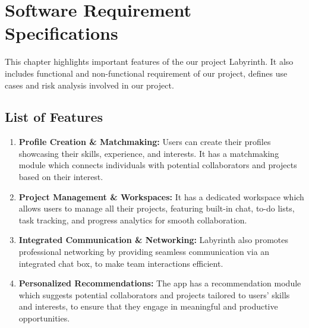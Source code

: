 \documentclass{FastFyp}
\begin{document}
\chapter{Software Requirement Specifications}
This chapter highlights important features of the our project Labyrinth. It also includes functional and non-functional requirement of our project, defines use cases and risk analysis involved in our project.
\section{List of Features}
\begin{enumerate}
    \item \textbf{Profile Creation \& Matchmaking:}  Users can create their profiles showcasing their skills, experience, and interests. It has a matchmaking module which connects individuals with potential collaborators and projects based on their interest.
    \item \textbf{Project Management \& Workspaces:} It has a dedicated workspace which allows users to manage all their projects, featuring built-in chat, to-do lists, task tracking, and progress analytics for smooth collaboration.
    \item \textbf{Integrated Communication \& Networking: } Labyrinth also promotes professional networking by providing seamless communication via an integrated chat box, to make team interactions efficient.
    \item \textbf{Personalized Recommendations: } The app has a recommendation module which suggests potential collaborators and projects tailored to users' skills and interests, to ensure that they engage in meaningful and productive opportunities.
\end{enumerate}
\end{document}
